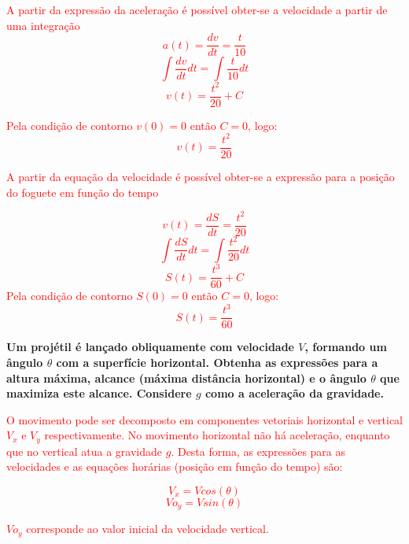 \documentclass[
    12pt, %
    openright,
    twoside, %
    a4paper, %
    article,
    english,brazil %
]{abntex2}
\begin{document}
\textcolor{red}{A partir da expressão da aceleração é possível obter-se a velocidade a partir de uma integração}
\textcolor{red}{
    $$a(t) = \frac{dv}{dt} = \frac{t}{10}$$
    $$\int \frac{dv}{dt} dt = \int \frac{t}{10} dt $$
    $$v(t) = \frac{t^2}{20} + C $$
}

\textcolor{red}{Pela condição de contorno $v(0) = 0$ então $C = 0$, logo:}
\textcolor{red}{
    $$v(t) = \frac{t^2}{20} $$
}


\textcolor{red}{A partir da equação da velocidade é possível obter-se a expressão para a posição do foguete em função do tempo}

\textcolor{red}{
    $$v(t) = \frac{dS}{dt} = \frac{t^2}{20} $$
    $$\int \frac{dS}{dt} dt = \int \frac{t^2}{20} dt$$
    $$S(t) = \frac{t^3}{60} + C $$
}
\textcolor{red}{Pela condição de contorno $S(0) = 0$ então $C = 0$, logo:}
\textcolor{red}{
    $$S(t) = \frac{t^3}{60} $$
}


\textbf{Um projétil é lançado obliquamente com velocidade $V$, formando um ângulo $\theta$ com a superfície horizontal. Obtenha as expressões para a altura máxima, alcance (máxima distância horizontal) e o ângulo $\theta$ que maximiza este alcance. Considere $g$ como a aceleração da gravidade.}

\textcolor{red}{O movimento pode ser decomposto em componentes vetoriais horizontal e vertical $V_x$ e $V_y$ respectivamente. No movimento horizontal não há aceleração, enquanto que no vertical atua a gravidade $g$. Desta forma, as expressões para as velocidades e as equações horárias (posição em função do tempo) são:}

\textcolor{red}{
    $$V_x = V cos(\theta)$$
    $$Vo_y = V sin(\theta)$$
}

\textcolor{red}{$Vo_y$ corresponde ao valor inicial da velocidade vertical.}
\end{document}
